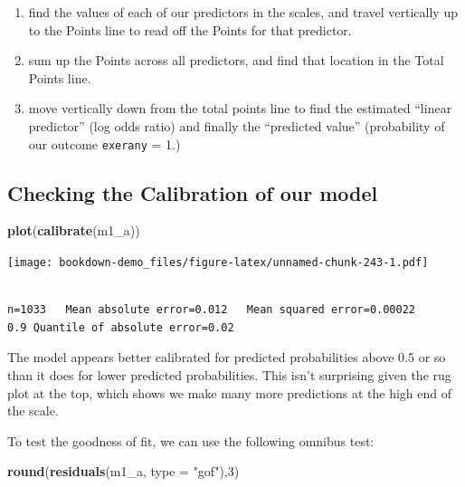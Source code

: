 \documentclass[]{book}
\newenvironment{Shaded}{\begin{snugshade}}{\end{snugshade}}
\newcommand{\KeywordTok}[1]{\textcolor[rgb]{0.13,0.29,0.53}{\textbf{#1}}}
\newcommand{\DataTypeTok}[1]{\textcolor[rgb]{0.13,0.29,0.53}{#1}}
\newcommand{\DecValTok}[1]{\textcolor[rgb]{0.00,0.00,0.81}{#1}}
\newcommand{\StringTok}[1]{\textcolor[rgb]{0.31,0.60,0.02}{#1}}
\newcommand{\NormalTok}[1]{#1}
\providecommand{\tightlist}{%
  \setlength{\itemsep}{0pt}\setlength{\parskip}{0pt}}
\theoremstyle{definition}
\theoremstyle{definition}
\theoremstyle{definition}
\theoremstyle{remark}
\begin{document}
\begin{enumerate}
\def\labelenumi{\arabic{enumi}.}
\tightlist
\item
  find the values of each of our predictors in the scales, and travel
  vertically up to the Points line to read off the Points for that
  predictor.
\item
  sum up the Points across all predictors, and find that location in the
  Total Points line.
\item
  move vertically down from the total points line to find the estimated
  ``linear predictor'' (log odds ratio) and finally the ``predicted
  value'' (probability of our outcome \texttt{exerany} = 1.)
\end{enumerate}

\subsection{Checking the Calibration of our
model}\label{checking-the-calibration-of-our-model}

\begin{Shaded}
\begin{Highlighting}[]
\KeywordTok{plot}\NormalTok{(}\KeywordTok{calibrate}\NormalTok{(m1_a))}
\end{Highlighting}
\end{Shaded}

\texttt{[image: bookdown-demo\_files/figure-latex/unnamed-chunk-243-1.pdf]}

\begin{verbatim}

n=1033   Mean absolute error=0.012   Mean squared error=0.00022
0.9 Quantile of absolute error=0.02
\end{verbatim}

The model appears better calibrated for predicted probabilities above
0.5 or so than it does for lower predicted probabilities. This isn't
surprising given the rug plot at the top, which shows we make many more
predictions at the high end of the scale.

To test the goodness of fit, we can use the following omnibus test:

\begin{Shaded}
\begin{Highlighting}[]
\KeywordTok{round}\NormalTok{(}\KeywordTok{residuals}\NormalTok{(m1_a, }\DataTypeTok{type =} \StringTok{"gof"}\NormalTok{),}\DecValTok{3}\NormalTok{)}
\end{Highlighting}
\end{Shaded}
\end{document}
